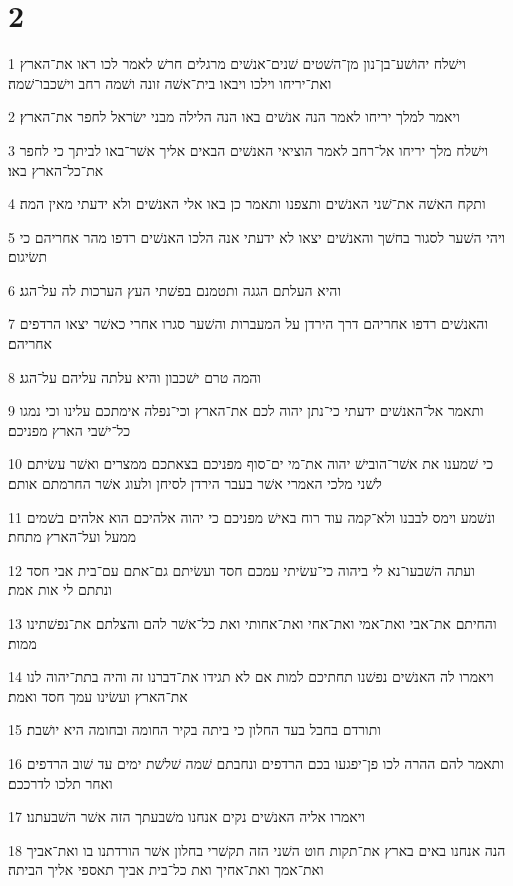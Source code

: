 \chapter{2}

\par 1 וישׁלח יהושׁע־בן־נון מן־השׁטים שׁנים־אנשׁים מרגלים חרשׁ לאמר לכו ראו את־הארץ ואת־יריחו וילכו ויבאו בית־אשׁה זונה ושׁמה רחב וישׁכבו־שׁמה׃
\par 2 ויאמר למלך יריחו לאמר הנה אנשׁים באו הנה הלילה מבני ישׂראל לחפר את־הארץ׃
\par 3 וישׁלח מלך יריחו אל־רחב לאמר הוציאי האנשׁים הבאים אליך אשׁר־באו לביתך כי לחפר את־כל־הארץ באו׃
\par 4 ותקח האשׁה את־שׁני האנשׁים ותצפנו ותאמר כן באו אלי האנשׁים ולא ידעתי מאין המה׃
\par 5 ויהי השׁער לסגור בחשׁך והאנשׁים יצאו לא ידעתי אנה הלכו האנשׁים רדפו מהר אחריהם כי תשׂיגום׃
\par 6 והיא העלתם הגגה ותטמנם בפשׁתי העץ הערכות לה על־הגג׃
\par 7 והאנשׁים רדפו אחריהם דרך הירדן על המעברות והשׁער סגרו אחרי כאשׁר יצאו הרדפים אחריהם׃
\par 8 והמה טרם ישׁכבון והיא עלתה עליהם על־הגג׃
\par 9 ותאמר אל־האנשׁים ידעתי כי־נתן יהוה לכם את־הארץ וכי־נפלה אימתכם עלינו וכי נמגו כל־ישׁבי הארץ מפניכם׃
\par 10 כי שׁמענו את אשׁר־הובישׁ יהוה את־מי ים־סוף מפניכם בצאתכם ממצרים ואשׁר עשׂיתם לשׁני מלכי האמרי אשׁר בעבר הירדן לסיחן ולעוג אשׁר החרמתם אותם׃
\par 11 ונשׁמע וימס לבבנו ולא־קמה עוד רוח באישׁ מפניכם כי יהוה אלהיכם הוא אלהים בשׁמים ממעל ועל־הארץ מתחת׃
\par 12 ועתה השׁבעו־נא לי ביהוה כי־עשׂיתי עמכם חסד ועשׂיתם גם־אתם עם־בית אבי חסד ונתתם לי אות אמת׃
\par 13 והחיתם את־אבי ואת־אמי ואת־אחי ואת־אחותי ואת כל־אשׁר להם והצלתם את־נפשׁתינו ממות׃
\par 14 ויאמרו לה האנשׁים נפשׁנו תחתיכם למות אם לא תגידו את־דברנו זה והיה בתת־יהוה לנו את־הארץ ועשׂינו עמך חסד ואמת׃
\par 15 ותורדם בחבל בעד החלון כי ביתה בקיר החומה ובחומה היא יושׁבת׃
\par 16 ותאמר להם ההרה לכו פן־יפגעו בכם הרדפים ונחבתם שׁמה שׁלשׁת ימים עד שׁוב הרדפים ואחר תלכו לדרככם׃
\par 17 ויאמרו אליה האנשׁים נקים אנחנו משׁבעתך הזה אשׁר השׁבעתנו׃
\par 18 הנה אנחנו באים בארץ את־תקות חוט השׁני הזה תקשׁרי בחלון אשׁר הורדתנו בו ואת־אביך ואת־אמך ואת־אחיך ואת כל־בית אביך תאספי אליך הביתה׃
